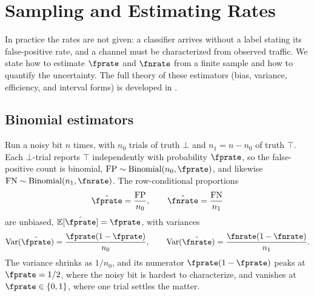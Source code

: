 %
%
%
%
%

\section{Sampling and Estimating Rates}
\label{sec:sampling-rates}

In practice the rates are not given: a classifier arrives without a label
stating its false-positive rate, and a channel must be characterized from
observed traffic. We state how to estimate $\fprate$ and $\fnrate$ from a
finite sample and how to quantify the uncertainty. The full theory of these
estimators (bias, variance, efficiency, and interval forms) is developed in
.

\subsection*{Binomial estimators}

Run a noisy bit $n$ times, with $n_0$ trials of truth $\bot$ and $n_1 = n -
n_0$ of truth $\top$. Each $\bot$-trial reports $\top$ independently with
probability $\fprate$, so the false-positive count is binomial,
$\mathrm{FP} \sim \mathrm{Binomial}(n_0, \fprate)$, and likewise
$\mathrm{FN} \sim \mathrm{Binomial}(n_1, \fnrate)$. The row-conditional
proportions
\[
  \hat{\fprate} = \frac{\mathrm{FP}}{n_0},
  \qquad
  \hat{\fnrate} = \frac{\mathrm{FN}}{n_1}
\]
are unbiased, $\mathbb{E}[\hat{\fprate}] = \fprate$, with variances
\[
  \mathrm{Var}(\hat{\fprate}) = \frac{\fprate(1 - \fprate)}{n_0},
  \qquad
  \mathrm{Var}(\hat{\fnrate}) = \frac{\fnrate(1 - \fnrate)}{n_1}.
\]
The variance shrinks as $1/n_0$, and its numerator $\fprate(1 - \fprate)$ peaks
at $\fprate = 1/2$, where the noisy bit is hardest to characterize, and
vanishes at $\fprate \in \{0, 1\}$, where one trial settles the matter.

